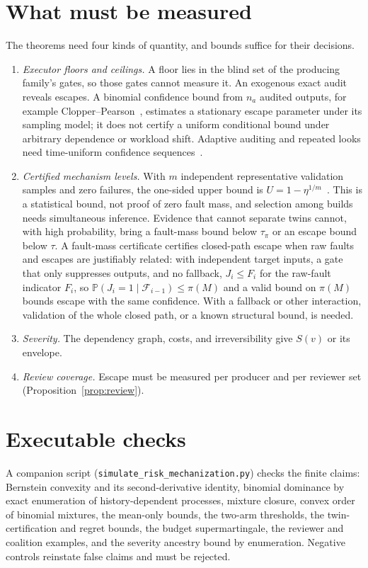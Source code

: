 \documentclass[11pt]{article}
\theoremstyle{definition}
\theoremstyle{remark}
\newcommand{\Prb}{\mathbb P}
\begin{document}
\section{What must be measured}\label{sec:measure}
The theorems need four kinds of quantity, and bounds suffice for their decisions.
\begin{enumerate}[leftmargin=*,itemsep=2pt]
\item \emph{Executor floors and ceilings.} A floor lies in the blind set of the producing family's
gates, so those gates cannot measure it. An exogenous exact audit reveals escapes. A binomial
confidence bound from $n_a$ audited outputs, for example Clopper--Pearson~\cite{clopper}, estimates a
stationary escape parameter under its sampling model; it does not certify a uniform conditional
bound under arbitrary dependence or workload shift. Adaptive auditing and repeated looks need
time-uniform confidence sequences~\cite{howard}.
\item \emph{Certified mechanism levels.} With $m$ independent representative validation samples and
zero failures, the one-sided upper bound is $U=1-\eta^{1/m}$~\cite{p5}. This is a statistical bound,
not proof of zero fault mass, and selection among builds needs simultaneous inference. Evidence that
cannot separate twins cannot, with high probability, bring a fault-mass bound below $\tau_\pi$ or an
escape bound below $\tau$. A fault-mass certificate certifies closed-path escape when raw faults and
escapes are justifiably related: with independent target inputs, a gate that only suppresses outputs,
and no fallback, $J_i\le F_i$ for the raw-fault indicator $F_i$, so $\Prb(J_i=1\mid\mathcal F_{i-1})\le\pi(M)$
and a valid bound on $\pi(M)$ bounds escape with the same confidence. With a fallback or other
interaction, validation of the whole closed path, or a known structural bound, is needed.
\item \emph{Severity.} The dependency graph, costs, and irreversibility give $S(v)$ or its envelope.
\item \emph{Review coverage.} Escape must be measured per producer and per reviewer set
(Proposition~\ref{prop:review}).
\end{enumerate}

\section{Executable checks}\label{sec:checks}
A companion script (\texttt{simulate\_risk\_mechanization.py}) checks the finite claims: Bernstein convexity and its second-derivative identity,
binomial dominance by exact enumeration of history-dependent processes, mixture closure, convex order
of binomial mixtures, the mean-only bounds, the two-arm thresholds, the twin-certification and regret
bounds, the budget supermartingale, the reviewer and coalition examples, and the severity ancestry
bound by enumeration. Negative controls reinstate false claims and must be rejected.
\end{document}
